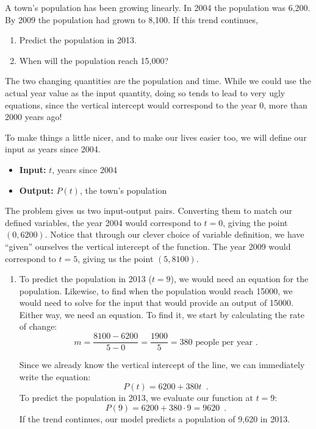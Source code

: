 \begin{example}
A town's population has been growing linearly. In 2004 the population was 6,200. By 2009 the population had grown to 8,100. If this trend continues,
  \begin{enumerate}[label={\alph*)}]
    \item Predict the population in 2013.
    \item When will the population reach 15,000?
  \end{enumerate}

\begin{solution} The two changing quantities are the population and time. While we could use the actual year value as the input quantity, doing so tends to lead to very ugly equations, since the vertical intercept would correspond to
the year 0, more than 2000 years ago!

To make things a little nicer, and to make our lives easier too, we will define our input as years since 2004.
  \begin{itemize}
      \item[] {\bf Input:} $t$, years since 2004
      \item[] {\bf Output:} $P(t)$, the town's population
    \end{itemize}
The problem gives us two input-output pairs. Converting them to match our defined variables, the year 2004 would correspond to $t = 0$, giving the point $(0, 6200)$. Notice that through our clever choice of variable definition, we have ``given'' ourselves the vertical intercept of the function. The year 2009 would correspond to $t = 5$, giving us
the point $(5, 8100)$.

\begin{enumerate}[label={\alph*)}]
  \item To predict the population in 2013 ($t = 9$), we would need an equation for the population. Likewise, to find when the population would reach 15000, we would need to solve for the input that would provide an output of 15000. Either way, we need an equation. To find it, we start by calculating the rate of change:
$$m = \frac{8100-6200}{5-0} = \frac{1900}{5} = 380 \mbox{ people per year .}$$

Since we already know the vertical intercept of the line, we can immediately write the equation:
$$P(t) = 6200 +380t \enspace .$$
To predict the population in 2013, we evaluate our function at $t = 9$:
$$P(9) = 6200 +380 \cdot 9 = 9620 \enspace .$$
If the trend continues, our model predicts a population of 9,620 in 2013.


\end{enumerate}
\end{solution}
\end{example}
